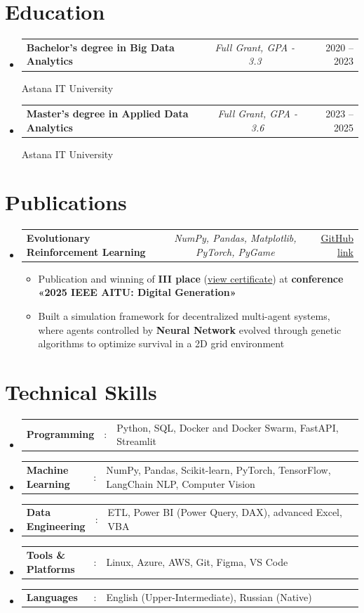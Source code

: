 \documentclass[a4paper,11pt]{article}
\makeatletter
\newcommand{\resumeItem}[1]{
  \item\small{#1}
}
\newcommand{\resumeItemListStart}{\begin{itemize}[rightmargin=0.11in]}
\newcommand{\resumeItemListEnd}{\end{itemize}}
\newcommand{\resumeSectionType}[3]{
  \item\begin{tabular*}{0.96\textwidth}[t]{
    p{0.20\linewidth}p{0.02\linewidth}p{0.78\linewidth}
  }
    \textbf{#1} & #2 & #3
  \end{tabular*}\vspace{-2pt}
}
\newcommand{\resumeTrioHeading}[3]{
  \item\small{
    \begin{tabular*}{0.96\textwidth}[t]{
      l@{\extracolsep{\fill}}c@{\extracolsep{\fill}}r
    }
      \textbf{#1} & \textit{#2} & #3
    \end{tabular*}
  }
}
\newcommand{\resumeHeadingListStart}{
  \begin{itemize}[leftmargin=0.15in, label={}]
}
\newcommand{\resumeHeadingListEnd}{\end{itemize}}
\makeatother
\begin{document}
\section{Education}
  \resumeHeadingListStart{}
    \resumeTrioHeading{Bachelor's degree in Big Data Analytics}{Full Grant, GPA - 3.3}{2020 -- 2023}
    {Astana IT University}{}
  \resumeHeadingListEnd{}

  \resumeHeadingListStart{}
    \resumeTrioHeading{Master's degree in Applied Data Analytics}{Full Grant, GPA - 3.6}{2023 -- 2025}
    {Astana IT University}{}
  \resumeHeadingListEnd{}



\section{Publications}
  \resumeHeadingListStart

      \resumeTrioHeading{Evolutionary Reinforcement Learning}{NumPy, Pandas, Matplotlib, PyTorch, PyGame}{\href{https://github.com/sovetskiysn/Digital-aquarium}{\uline{GitHub link}}}
      \resumeItemListStart{}
        \resumeItem{Publication and winning of \textbf{III place} (\href{https://raw.githubusercontent.com/sovetskiysn/Digital-aquarium/refs/heads/main/images/certificate.jpg}{\uline{view certificate}})} at \textbf{conference «2025 IEEE AITU: Digital Generation»}
        \resumeItem{Built a simulation framework for decentralized multi-agent systems, where agents controlled by \textbf{Neural Network} evolved through genetic algorithms to optimize survival in a 2D grid environment}


        
      \resumeItemListEnd{}
  \resumeHeadingListEnd{}

\section{Technical Skills}
  \resumeHeadingListStart{}
    \resumeSectionType{Programming}{:}{Python, SQL, Docker and Docker Swarm, FastAPI, Streamlit}
    \resumeSectionType{Machine Learning}{:}{NumPy, Pandas, Scikit-learn, PyTorch, TensorFlow, LangChain \newline NLP, Computer Vision}
    \resumeSectionType{Data Engineering}{:}{ETL, Power BI (Power Query, DAX), advanced Excel, VBA}
    \resumeSectionType{Tools \& Platforms}{:}{Linux, Azure, AWS, Git, Figma, VS Code}
    \resumeSectionType{Languages}{:}{English (Upper-Intermediate), Russian (Native)}
  \resumeHeadingListEnd{}
\end{document}
